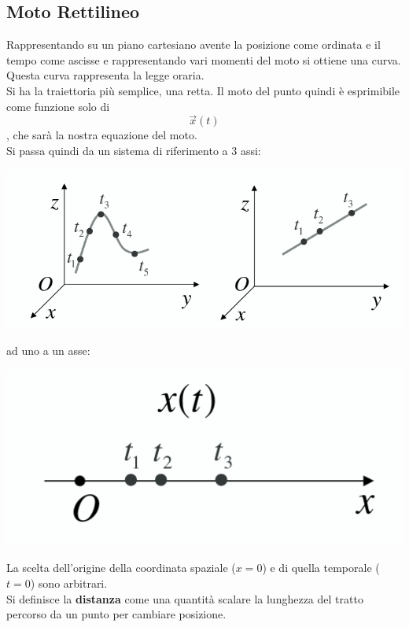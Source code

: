 \documentclass[a4paper,12pt, oneside]{book}
\begin{document}
\subsection{Moto Rettilineo}
Rappresentando su un piano cartesiano avente la posizione come ordinata e il tempo come ascisse e rappresentando vari momenti del moto si ottiene una curva. Questa curva rappresenta la legge oraria.\\
Si ha la traiettoria più semplice, una retta. Il moto del punto quindi è esprimibile come funzione solo di $$\vec{x}(t)$$, che sarà la nostra equazione del moto.\\
Si passa quindi da un sistema di riferimento a 3 assi:
\begin{center}
	\includegraphics[scale=0.5]{img/rett.png}
\end{center}
ad uno a un asse:
\begin{center}
	\includegraphics[scale=0.3]{img/ret2.png}
\end{center}
La scelta dell'origine della coordinata spaziale ($x=0$) e di quella temporale ($t=0$) sono arbitrari.\\
Si definisce la \textbf{distanza} come una quantità scalare la lunghezza del tratto percorso da un punto per cambiare posizione.
\end{document}
